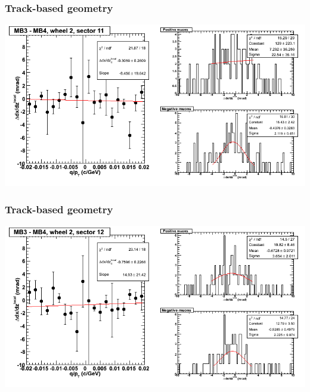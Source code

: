 \documentclass[compress]{beamer}
\begin{document}
\begin{frame}
\frametitle{Track-based geometry}
\includegraphics[width=\linewidth]{NOV4_segdiffs/dt13_slope_E_11_34.png}
\end{frame}

\begin{frame}
\frametitle{Track-based geometry}
\includegraphics[width=\linewidth]{NOV4_segdiffs/dt13_slope_E_12_34.png}
\end{frame}

\end{document}
